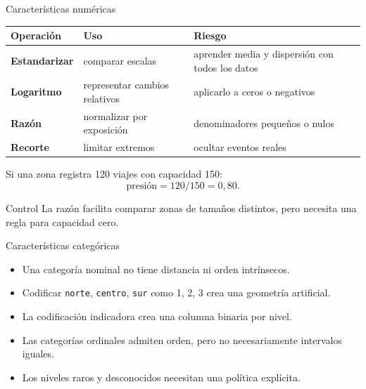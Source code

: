 \documentclass[aspectratio=169,10pt]{beamer}
\begin{document}
\begin{frame}{Características numéricas}
  \footnotesize
  \begin{tabularx}{\textwidth}{>{\bfseries}p{} p{} X}
    \toprule Operación & Uso & Riesgo \\ \midrule
    Estandarizar & comparar escalas & aprender media y dispersión con todos los datos \\
    Logaritmo & representar cambios relativos & aplicarlo a ceros o negativos \\
    Razón & normalizar por exposición & denominadores pequeños o nulos \\
    Recorte & limitar extremos & ocultar eventos reales \\
    \bottomrule
  \end{tabularx}
  \vspace{.35em}
  Si una zona registra 120 viajes con capacidad 150:
  \[
    \text{presión}=120/150=0{,}80.
  \]
  \begin{alertblock}{Control}
    La razón facilita comparar zonas de tamaños distintos, pero necesita una regla para capacidad cero.
  \end{alertblock}
\end{frame}

\begin{frame}{Características categóricas}
  \small
  \begin{itemize}
    \item Una categoría nominal no tiene distancia ni orden intrínsecos.
    \item Codificar \texttt{norte}, \texttt{centro}, \texttt{sur} como 1, 2, 3 crea una geometría artificial.
    \item La codificación indicadora crea una columna binaria por nivel.
    \item Las categorías ordinales admiten orden, pero no necesariamente intervalos iguales.
    \item Los niveles raros y desconocidos necesitan una política explícita.
  \end{itemize}
\end{frame}
\end{document}
